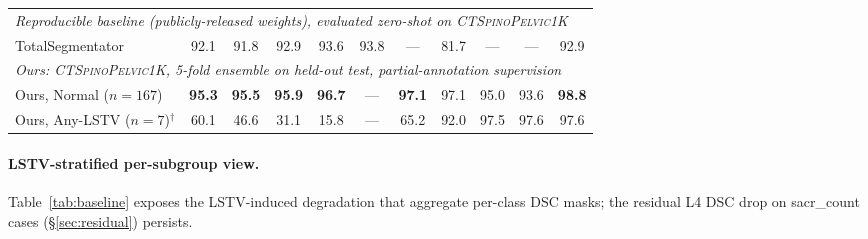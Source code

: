 \documentclass{article}
\newcommand{\dataset}{\textsc{CTSpinoPelvic1K}}
\newcommand{\TS}{TotalSegmentator}
\begin{document}
\begin{table}[t]
{\begin{tabular}{lcccccccccc}
\midrule
\multicolumn{11}{l}{\emph{Reproducible baseline (publicly-released weights), evaluated zero-shot on \dataset{}}} \\
\TS{}~\citep{Wasserthal2023TotalSegmentator:Images}  & 92.1 & 91.8 & 92.9 & 93.6 & 93.8 & --- & 81.7 & --- & --- & 92.9 \\
\midrule
\multicolumn{11}{l}{\emph{Ours: \dataset{}, 5-fold ensemble on held-out test, partial-annotation supervision}} \\
Ours, Normal ($n{=}167$)   & \textbf{95.3} & \textbf{95.5} & \textbf{95.9} & \textbf{96.7} & --- & \textbf{97.1} & 97.1 & 95.0 & 93.6 & \textbf{98.8} \\
Ours, Any-LSTV ($n{=}7$)$^{\dagger}$ & 60.1 & 46.6 & 31.1 & 15.8 & --- & 65.2 & 92.0 & 97.5 & 97.6 & 97.6 \\
\bottomrule
\end{tabular}%
}
\end{table}

\paragraph{LSTV-stratified per-subgroup view.}
Table~\ref{tab:baseline} exposes the LSTV-induced
degradation that aggregate per-class DSC masks; the
residual L4 DSC drop on sacr\_count cases
(\S\ref{sec:residual}) persists.
\end{document}
